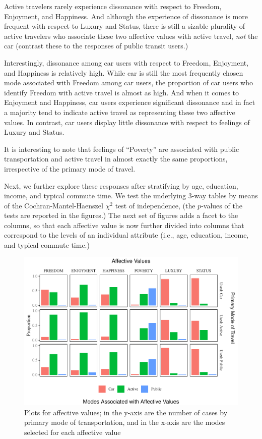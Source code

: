 \documentclass[]{elsarticle} %
\begin{document}
Active travelers rarely experience dissonance with respect to Freedom,
Enjoyment, and Happiness. And although the experience of dissonance is
more frequent with respect to Luxury and Status, there is still a
sizable plurality of active travelers who associate these two affective
values with active travel, \emph{not} the car (contrast these to the
responses of public transit users.)

Interestingly, dissonance among car users with respect to Freedom,
Enjoyment, and Happiness is relatively high. While car is still the most
frequently chosen mode associated with Freedom among car users, the
proportion of car users who identify Freedom with active travel is
almost as high. And when it comes to Enjoyment and Happiness, car users
experience significant dissonance and in fact a majority tend to
indicate active travel as representing these two affective values. In
contrast, car users display little dissonance with respect to feelings
of Luxury and Status.

It is interesting to note that feelings of ``Poverty'' are associated
with public transportation and active travel in almost exactly the same
proportions, irrespective of the primary mode of travel.

Next, we further explore these responses after stratifying by age,
education, income, and typical commute time. We test the underlying
3-way tables by means of the Cochran-Mantel-Haenszel \(\chi^2\) test of
independence, (the \(p\)-values of the tests are reported in the
figures.) The next set of figures adds a facet to the columns, so that
each affective value is now further divided into columns that correspond
to the levels of an individual attribute (i.e., age, education, income,
and typical commute time.)

\begin{figure}
\centering
\includegraphics{Dissonance_Santiago_v3_files/figure-latex/figure-bar-plots-by-attribute-1.pdf}
\caption{\label{fig:bar-plots-by-attribute}Plots for affective values;
in the y-axis are the number of cases by primary mode of transportation,
and in the x-axis are the modes selected for each affective value}
\end{figure}
\end{document}
